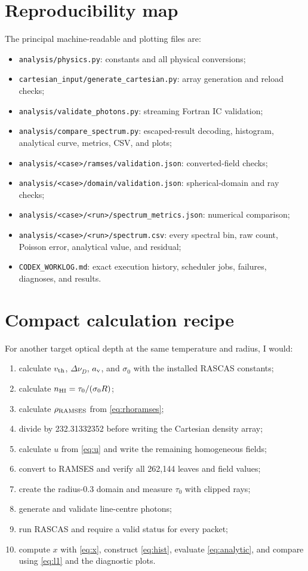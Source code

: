 \documentclass[11pt,a4paper]{article}
\newcommand{\tauzero}{\tau_0}
\newcommand{\av}{a_{\rm v}}
\newcommand{\nhi}{n_{\rm HI}}
\begin{document}
\appendix
\section{Reproducibility map}

The principal machine-readable and plotting files are:
\begin{itemize}
\item \texttt{analysis/physics.py}: constants and all physical conversions;
\item \texttt{cartesian\_input/generate\_cartesian.py}: array generation and reload checks;
\item \texttt{analysis/validate\_photons.py}: streaming Fortran IC validation;
\item \texttt{analysis/compare\_spectrum.py}: escaped-result decoding, histogram,
analytical curve, metrics, CSV, and plots;
\item \texttt{analysis/<case>/ramses/validation.json}: converted-field checks;
\item \texttt{analysis/<case>/domain/validation.json}: spherical-domain and ray checks;
\item \texttt{analysis/<case>/<run>/spectrum\_metrics.json}: numerical comparison;
\item \texttt{analysis/<case>/<run>/spectrum.csv}: every spectral bin, raw count,
Poisson error, analytical value, and residual;
\item \texttt{CODEX\_WORKLOG.md}: exact execution history, scheduler jobs, failures,
diagnoses, and results.
\end{itemize}

\section{Compact calculation recipe}

For another target optical depth at the same temperature and radius, I would:
\begin{enumerate}
\item calculate $v_{\rm th}$, $\Delta\nu_D$, $\av$, and $\sigma_0$ with the
installed RASCAS constants;
\item calculate $\nhi=\tauzero/(\sigma_0R)$;
\item calculate $\rho_{\rm RAMSES}$ from \ref{eq:rhoramses};
\item divide by 232.31332352 before writing the Cartesian density array;
\item calculate $u$ from \ref{eq:u} and write the remaining homogeneous fields;
\item convert to RAMSES and verify all 262,144 leaves and field values;
\item create the radius-0.3 domain and measure $\tauzero$ with clipped rays;
\item generate and validate line-centre photons;
\item run RASCAS and require a valid status for every packet;
\item compute $x$ with \ref{eq:x}, construct \ref{eq:hist}, evaluate
\ref{eq:analytic}, and compare using \ref{eq:l1} and the diagnostic plots.
\end{enumerate}
\end{document}
